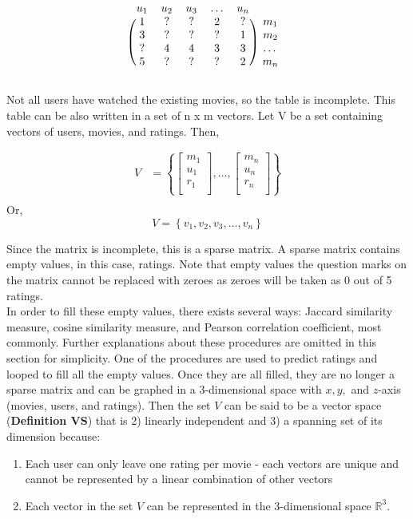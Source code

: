 \documentclass[paper=a4, fontsize=12pt]{scrartcl} %
\numberwithin{equation}{section} %
\numberwithin{figure}{section} %
\numberwithin{table}{section} %
\newcommand{\matxxx}[3] {
\begin{bmatrix}
  #1 \\
  #2 \\
  #3 \\
\end{bmatrix}
}
\begin{document}
  \[
    \begin{blockarray}{cccccc}
      u_1 & u_2 & u_3 & \dots & u_n \\
      \begin{block}{(ccccc)c}
        1 & ? & ? & 2 & ? & m_1 \\
        3 & ? & ? & ? & 1 & m_2 \\
        ? & 4 & 4 & 3 & 3 & \dots \\
        5 & ? & ? & ? & 2 & m_n \\
      \end{block}
    \end{blockarray}
  \]

  Not all users have watched the existing movies, so the table is incomplete.
  This table can be also written in a set of n x m vectors. Let V be a set
  containing vectors of users, movies, and ratings. Then,

  \[
    \begin{split}
      V & =
      \left\{
        \matxxx{m_1}{u_1}{r_1}, \dots, \matxxx{m_n}{u_n}{r_n}
      \right\} \\
    \end{split}
  \]
  Or,
  \[
    V = \left\{ v_1, v_2, v_3, \dots, v_n \right\}
  \]

  Since the matrix is incomplete, this is a sparse matrix. A sparse matrix
  contains empty values, in this case, ratings. Note that empty values \textemdash the
  question marks on the matrix \textemdash cannot be replaced with zeroes as
  zeroes will be taken as 0 out of 5 ratings. \\

  In order to fill these empty values, there exists several ways: Jaccard
  similarity measure, cosine similarity measure, and Pearson correlation
  coefficient, most commonly. Further explanations about these procedures are
  omitted in this section for simplicity. One of the procedures are used to
  predict ratings and looped to fill all the empty values. Once they are all
  filled, they are no longer a sparse matrix and can be graphed in a
  3-dimensional space with \(x, y, \) and \(z\)-axis (movies, users, and ratings).
  Then the set \(V\) can be said to be a vector space (\textbf{Definition VS}) that is 2)
  linearly independent and 3) a spanning set of its dimension because:

  \begin{enumerate}
  \item Each user can only leave one rating per movie - each vectors are
    unique and cannot be represented by a linear combination of other vectors
  \item Each vector in the set \(V\) can be represented in the 3-dimensional
    space \(\mathbb{R}^{3}\).
  \end{enumerate}
\end{document}

